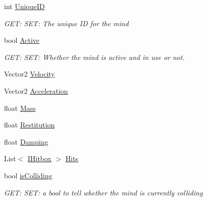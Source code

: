 \begin{DoxyCompactItemize}
\item 
int \hyperlink{a00318_ab109f6638be56427f557f69b11beb995}{Unique\+ID}
\begin{DoxyCompactList}\small\item\em G\+ET\+: S\+ET\+: The unique ID for the mind \end{DoxyCompactList}\item 
bool \hyperlink{a00318_add1498255352d92a5c96223a4d3cd657}{Active}
\begin{DoxyCompactList}\small\item\em G\+ET\+: S\+ET\+: Whether the mind is active and in use or not. \end{DoxyCompactList}\item 
Vector2 \hyperlink{a00318_a5e95a120aad31ed943ae34b70083af85}{Velocity}
\item 
Vector2 \hyperlink{a00318_ae117e7b4888d0d83ff72a586e9950b1e}{Acceleration}
\item 
float \hyperlink{a00318_a7369f95c6d11a97fcf38873430b9d9a6}{Mass}
\item 
float \hyperlink{a00318_a5d7175d3d87a533671551699c8bb93d0}{Restitution}
\item 
float \hyperlink{a00318_a9e29defb461be7a43ce274f721fb1225}{Damping}
\item 
List$<$ \hyperlink{a00434}{I\+Hitbox} $>$ \hyperlink{a00318_a09090a0316ecac49619a01a56a9a30b1}{Hits}
\item 
bool \hyperlink{a00318_ab39c2af5a8338a67744d42891a2dc3ce}{is\+Colliding}
\begin{DoxyCompactList}\small\item\em G\+ET\+: S\+ET\+: a bool to tell whether the mind is currently colliding \end{DoxyCompactList}\item 

\end{DoxyCompactItemize}
